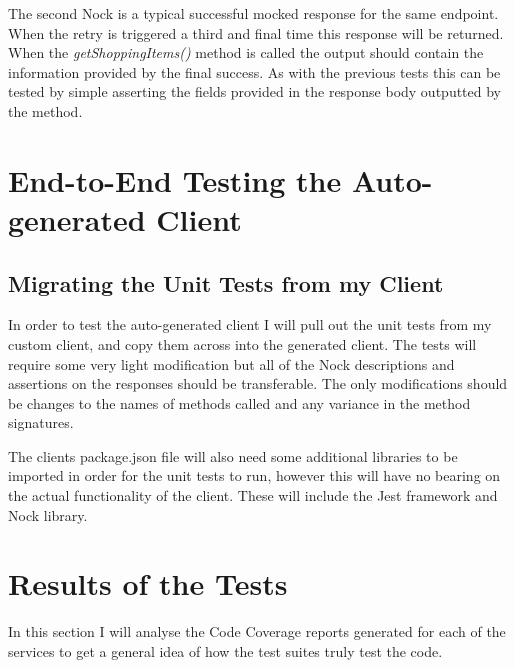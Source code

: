 The second Nock is a typical successful mocked response for the same endpoint. When the retry is triggered a third and final time this response will be returned. When the \textit{getShoppingItems()} method is called the output should contain the information provided by the final success. As with the previous tests this can be tested by simple asserting the fields provided in the response body outputted by the method.
\section{End-to-End Testing the Auto-generated Client}
\subsection{Migrating the Unit Tests from my Client}
In order to test the auto-generated client I will pull out the unit tests from my custom client, and copy them across into the generated client. The tests will require some very light modification but all of the Nock descriptions and assertions on the responses should be transferable. The only modifications should be changes to the names of methods called and any variance in the method signatures.

The clients package.json file will also need some additional libraries to be imported in order for the unit tests to run, however this will have no bearing on the actual functionality of the client. These will include the Jest framework and Nock library.
\section{Results of the Tests}
In this section I will analyse the Code Coverage reports generated for each of the services to get a general idea of how the test suites truly test the code.
\FloatBarrier
